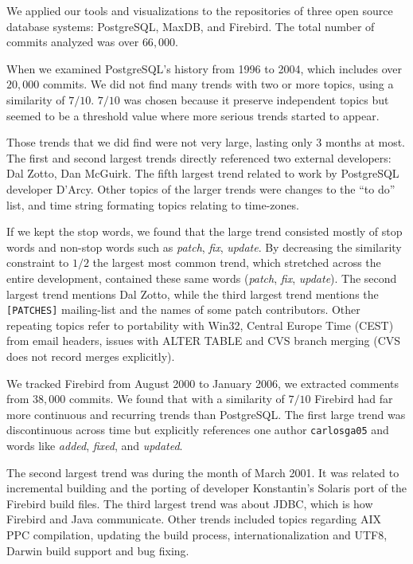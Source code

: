 \documentclass[times, 10pt,twocolumn]{article}
\newcommand{\shrinkit}{\vspace*{-.3em}}
\begin{document}
We applied our tools and visualizations to the repositories of three
open source database systems: PostgreSQL, MaxDB, and Firebird. The
total number of commits analyzed was over $66,000$.


\shrinkit
{}
\shrinkit


When we examined PostgreSQL's history from 1996 to 2004, which includes
over $20,000$ commits. We did not find many trends with two or more
topics, using a similarity of $7/10$. $7/10$ was chosen because it
preserve independent topics but seemed to be a threshold
value where more serious trends started to appear.

Those trends that we did find
were not very large, lasting only 3 months at most. The first and second
largest trends directly referenced two external developers:
Dal Zotto, Dan McGuirk. The fifth largest trend related to work by
PostgreSQL developer D'Arcy. Other topics of the larger trends were
changes to the ``to do'' list, and time string formating topics
relating to time-zones.

If we kept the stop words, we found that the large trend consisted
mostly of stop words and non-stop words such as \emph{patch},
\emph{fix}, \emph{update}.  By decreasing the similarity constraint to
$1/2$ the largest most common trend, which stretched across
the entire development, contained these same words (\emph{patch},
\emph{fix}, \emph{update}). The second largest trend mentions Dal
Zotto, while the third largest trend mentions the \texttt{[PATCHES]}
mailing-list and the names of some patch contributors.  Other repeating
topics refer to portability with Win32, Central Europe Time (CEST)
from email headers, issues with ALTER TABLE and CVS branch merging
(CVS does not record merges explicitly).


\shrinkit
{}
\shrinkit



We tracked Firebird from August 2000 to January 2006, we extracted comments from $38,000$ commits. We found that with a
similarity of $7/10$ Firebird had far more continuous and
recurring trends than PostgreSQL.  The first large trend was discontinuous
across time but explicitly references one author \texttt{carlosga05}
and words like \emph{added}, \emph{fixed}, and \emph{updated}.

The second largest trend was during the month of March 2001. It was
related to incremental building and the porting of developer
Konstantin's Solaris port of the Firebird build files. The third
largest trend was about JDBC, which is how Firebird and Java
communicate.  Other trends included topics regarding AIX PPC
compilation, updating the build process, internationalization and
UTF8, Darwin build support and bug fixing.
\end{document}
